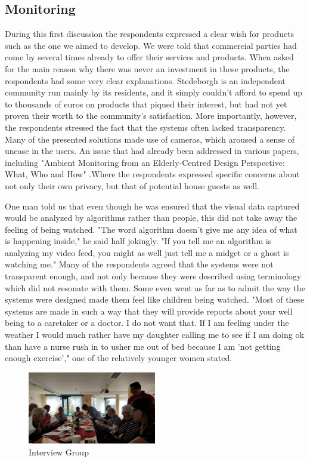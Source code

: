 \documentclass{below-ext}
\begin{document}
\subsection{Monitoring}
During this first discussion the respondents expressed a clear wish for products such as the one we aimed to develop. We were told that commercial parties had come by several times already to offer their services and products. When asked for the main reason why there was never an investment in these products, the respondents had some very clear explanations. Stedeborgh is an independent community run mainly by its residents, and it simply couldn't afford to spend up to thousands of euros on products that piqued their interest, but had not yet proven their worth to the community's satisfaction. More importantly, however, the respondents stressed the fact that the systems often lacked transparency. Many of the presented solutions made use of cameras, which aroused a sense of unease in the users. An issue that had already been addressed in various papers, including "Ambient Monitoring from an Elderly-Centred Design Perspective: What, Who and How" \cite{Kanis:2011:AME:2177525.2177579}.Where the respondents expressed specific concerns about not only their own privacy, but that of potential house guests as well.

One man told us that even though he was ensured that the visual data captured would be analyzed by algorithms rather than people, this did not take away the feeling of being watched. "The word algorithm doesn't give me any idea of what is happening inside," he said half jokingly. "If you tell me an algorithm is analyzing my video feed, you might as well just tell me a midget or a ghost is watching me." Many of the respondents agreed that the systems were not transparent enough, and not only because they were described using terminology which did not resonate with them. Some even went as far as to admit the way the systems were designed made them feel like children being watched. %
"Most of these systems are made in such a way that they will provide reports about your well being to a caretaker or a doctor. I do not want that. If I am feeling under the weather I would much rather have my daughter calling me to see if I am doing ok than have a nurse rush in to usher me out of bed because I am 'not getting enough exercise'," one of the relatively younger women stated. 

\begin{figure}
\centering
\includegraphics[width=0.5\textwidth]{interview}
\caption{Interview Group}
\label{fig:interview}
\end{figure}
\end{document}
